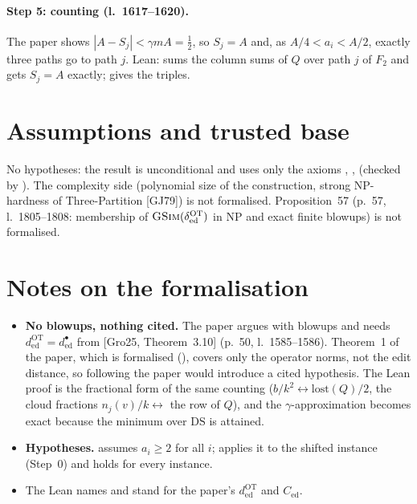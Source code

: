 \paragraph{Step 5: counting (l.~1617--1620).} The paper shows $|A-S_j|<\gamma mA=\tfrac12$, so $S_j=A$ and,
as $A/4<a_i<A/2$, exactly three paths go to path $j$. Lean:  sums the column sums of
$Q$ over path $j$ of $F_2$ and gets $S_j=A$ exactly;  gives the triples.

\section{Assumptions and trusted base}
No hypotheses: the result is unconditional and uses only the axioms ,
,  (checked by ). The complexity side
(polynomial size of the construction, strong NP-hardness of Three-Partition [GJ79]) is not formalised.
Proposition~57 (p.~57, l.~1805--1808: membership of $\textsc{GSim}(\delta^{\mathrm{OT}}_{\mathrm{ed}})$ in NP
and exact finite blowups) is not formalised.

\section{Notes on the formalisation}
\begin{itemize}
\item \textbf{No blowups, nothing cited.} The paper argues with blowups and needs
  $d^{\mathrm{OT}}_{\mathrm{ed}}=d^{\bullet}_{\mathrm{ed}}$ from [Gro25, Theorem~3.10] (p.~50, l.~1585--1586).
  Theorem~1 of the paper, which is formalised
  (), covers only the operator norms, not the edit distance, so following the paper
  would introduce a cited hypothesis. The Lean proof is the fractional form of the same counting
  ($b/k^2\leftrightarrow\mathrm{lost}(Q)/2$, the cloud fractions $n_j(v)/k\leftrightarrow$ the row of $Q$),
  and the $\gamma$-approximation becomes exact because the minimum over $\mathrm{DS}$ is attained.
\item \textbf{Hypotheses.}  assumes $a_i\ge2$ for all $i$;
   applies it to the shifted instance (Step~0) and holds for every instance.
\item The Lean names  and  stand for the paper's $d^{\mathrm{OT}}_{\mathrm{ed}}$ and
  $C_{\mathrm{ed}}$.
\end{itemize}

